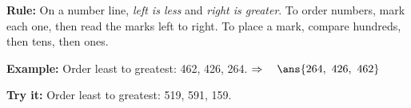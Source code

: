 \documentclass[12pt]{article}
\begin{document}

\begin{formulabox}
\textbf{Rule:} On a number line, \emph{left is less} and \emph{right is
greater}. To order numbers, mark each one, then read the marks left to
right. To place a mark, compare hundreds, then tens, then ones.
\end{formulabox}

\begin{examplebox}
\textbf{Example:} \quad Order least to greatest: 462, 426, 264.
$\Rightarrow\quad \ans{264,\ 426,\ 462}$
\end{examplebox}

\begin{tryitbox}
\textbf{Try it:} \quad Order least to greatest: 519, 591, 159.\\[2pt]
\end{tryitbox}
\end{document}
